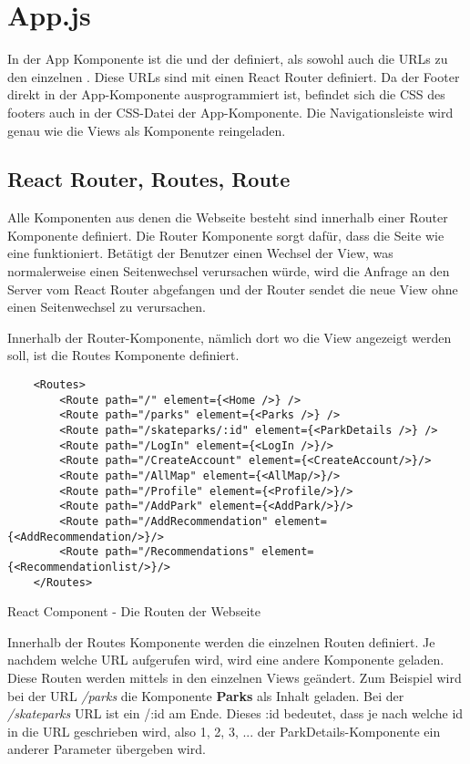 \section{App.js}
\label{appDatei}

In der App Komponente ist die \underline{} und der \underline{} definiert, 
als sowohl auch die URLs zu den einzelnen \underline{}. Diese URLs sind mit einen React 
Router definiert. Da der Footer direkt in der App-Komponente ausprogrammiert ist, 
befindet sich die CSS des footers auch in der CSS-Datei der App-Komponente. Die Navigationsleiste wird genau 
wie die Views als Komponente reingeladen.

\subsection{React Router, Routes, Route}
Alle Komponenten aus denen die Webseite besteht sind innerhalb einer Router Komponente definiert. Die 
Router Komponente sorgt dafür, dass die Seite wie eine \underline{} funktioniert. Betätigt
der Benutzer einen Wechsel der View, was normalerweise einen Seitenwechsel verursachen würde, wird die 
Anfrage an den Server vom React Router abgefangen und der Router sendet die neue View ohne einen 
Seitenwechsel zu verursachen. 


Innerhalb der Router-Komponente, nämlich dort wo die View angezeigt werden soll, ist die Routes
Komponente definiert.
\begin{code}[htp]
\begin{lstlisting}
    <Routes>
        <Route path="/" element={<Home />} />
        <Route path="/parks" element={<Parks />} />
        <Route path="/skateparks/:id" element={<ParkDetails />} />
        <Route path="/LogIn" element={<LogIn />}/>
        <Route path="/CreateAccount" element={<CreateAccount/>}/>
        <Route path="/AllMap" element={<AllMap/>}/>
        <Route path="/Profile" element={<Profile/>}/>
        <Route path="/AddPark" element={<AddPark/>}/>
        <Route path="/AddRecommendation" element={<AddRecommendation/>}/>
        <Route path="/Recommendations" element={<Recommendationlist/>}/>
    </Routes>
\end{lstlisting} 
\caption{React Component - Die Routen der Webseite}
\end{code}
Innerhalb der Routes Komponente werden die einzelnen Routen definiert. Je nachdem welche URL aufgerufen wird,
wird eine andere Komponente geladen. Diese Routen werden mittels \underline{} in den einzelnen 
Views geändert. Zum Beispiel wird bei der URL \textit{/parks} die Komponente \textbf{Parks} als 
Inhalt geladen. Bei der \textit{/skateparks} URL ist ein /:id am Ende. Dieses :id 
bedeutet, dass je nach welche id in die URL geschrieben wird, also 1, 2, 3, ... der 
ParkDetails-Komponente ein anderer Parameter übergeben wird. 


